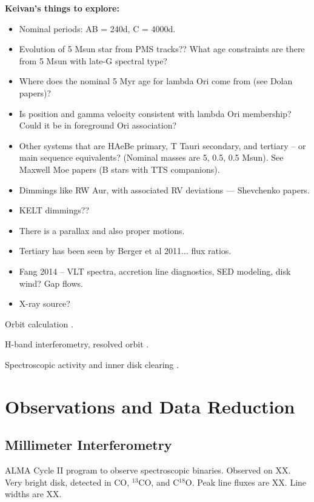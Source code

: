 \documentclass{aastex6}
\newcommand{\twelve}{CO}
\newcommand{\thirteen}{${}^{13}$CO}
\newcommand{\eighteen}{C${}^{18}$O}
\begin{document}
\noindent
{\bf Keivan's things to explore:}
\begin{itemize}
\item Nominal periods: AB = 240d, C = 4000d.
\item Evolution of 5 Msun star from PMS tracks?? What age constraints are there from 5 Msun with late-G spectral type?
\item Where does the nominal 5 Myr age for lambda Ori come from (see Dolan papers)?
\item Is position and gamma velocity consistent with lambda Ori membership? Could it be in foreground Ori association?
\item Other systems that are HAeBe primary, T Tauri secondary, and tertiary -- or main sequence equivalents? (Nominal masses are 5, 0.5, 0.5 Msun). See Maxwell Moe papers (B stars with TTS companions).
\item Dimmings like RW Aur, with associated RV deviations --- Shevchenko papers.
\item KELT dimmings??
\item There is a parallax and also proper motions.
\item Tertiary has been seen by Berger et al 2011... flux ratios.
\item Fang 2014 -- VLT spectra, accretion line diagnostics, SED modeling, disk wind? Gap flows.
\item X-ray source?
\end{itemize}

Orbit calculation \citep{mathieu91}.

H-band interferometry, resolved orbit \citep{berger11}.

Spectroscopic activity and inner disk clearing \citep{fang14}.

\section{Observations and Data Reduction}

\subsection{Millimeter Interferometry}

ALMA Cycle II program to observe spectroscopic binaries. Observed on XX. Very bright disk, detected in \twelve, \thirteen, and \eighteen. Peak line fluxes are XX. Line widths are XX.
\end{document}
